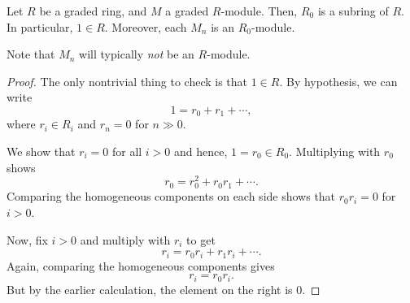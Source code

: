 \documentclass[12pt]{article}
\begin{document}
\begin{prop}
	Let $R$ be a graded ring, and $M$ a graded $R$-module. \newline
	Then, $R_{0}$ is a subring of $R$. In particular, $1 \in R$. \newline
	Moreover, each $M_{n}$ is an $R_{0}$-module.
\end{prop}
Note that $M_{n}$ will typically \emph{not} be an $R$-module.
\begin{proof} 
	The only nontrivial thing to check is that $1 \in R$. By hypothesis, we can write
	\begin{equation} \label{eq:001}
		1 = r_{0} + r_{1} + \cdots,
	\end{equation}
	where $r_{i} \in R_{i}$ and $r_{n} = 0$ for $n \gg 0$.

	We show that $r_{i} = 0$ for all $i > 0$ and hence, $1 = r_{0} \in R_{0}$. \newline
	Multiplying  with $r_{0}$ shows
	\begin{equation*} 
		r_{0} = r_{0}^{2} + r_{0}r_{1} + \cdots .
	\end{equation*}
	Comparing the homogeneous components on each side shows that $r_{0} r_{i} = 0$ for $i > 0$. \newline

	Now, fix $i > 0$ and multiply  with $r_{i}$ to get
	\begin{equation*} 
		r_{i} = r_{0} r_{i} + r_{1} r_{i} + \cdots.
	\end{equation*}
	Again, comparing the homogeneous components gives
	\begin{equation*} 
		r_{i} = r_{0} r_{i}.
	\end{equation*}
	But by the earlier calculation, the element on the right is $0$. 
\end{proof}
\end{document}
